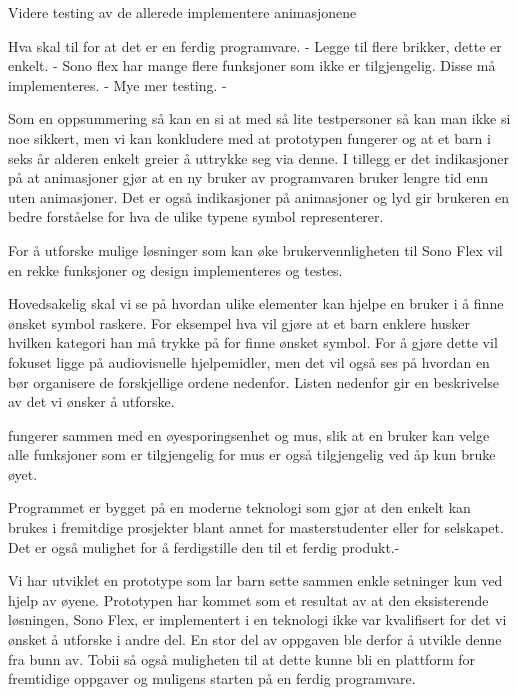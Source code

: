 Videre testing av de allerede implementere animasjonene

Hva skal til for at det er en ferdig programvare.
    - Legge til flere brikker, dette er enkelt.
    - Sono flex har mange flere funksjoner som ikke er tilgjengelig. Disse må implementeres. 
    - Mye mer testing.
    - 


Som en oppsummering så kan en si at med så lite testpersoner så kan man ikke si noe sikkert, men vi kan konkludere med at prototypen fungerer og at et barn i seks år alderen enkelt greier å uttrykke seg via denne. I tillegg er det indikasjoner på at animasjoner gjør at en ny bruker av programvaren bruker lengre tid enn uten animasjoner. Det er også indikasjoner på animasjoner og lyd gir brukeren en bedre forståelse for hva de ulike typene symbol representerer.  

For å utforske mulige løsninger som kan øke brukervennligheten til Sono Flex  vil en rekke funksjoner og design implementeres og testes. 

Hovedsakelig skal vi se på hvordan ulike elementer kan hjelpe en bruker i å finne ønsket symbol raskere. For eksempel hva vil gjøre at et barn enklere husker hvilken kategori han må trykke på for finne ønsket symbol. For å gjøre dette vil fokuset ligge på audiovisuelle hjelpemidler, men det vil også ses på hvordan en bør organisere de forskjellige ordene nedenfor. Listen nedenfor gir en  beskrivelse av det vi ønsker å utforske.



fungerer sammen med en øyesporingsenhet og mus, slik at en bruker kan velge alle funksjoner som er tilgjengelig for mus er også tilgjengelig ved åp kun bruke øyet.

Programmet er bygget på en moderne teknologi som gjør at den enkelt kan brukes i fremitdige prosjekter blant annet for masterstudenter eller for selskapet. Det er også mulighet for å ferdigstille den til et ferdig produkt.-



Vi har utviklet en prototype som lar barn sette sammen enkle setninger kun ved hjelp av øyene. Prototypen har kommet som et resultat av at den eksisterende løsningen, Sono Flex, er implementert i en teknologi ikke var kvalifisert for det vi ønsket å utforske i andre del. En stor del av oppgaven ble derfor å utvikle denne fra bunn av. Tobii så også muligheten til at dette kunne bli en plattform for fremtidige oppgaver og muligens starten på en ferdig programvare. 
























